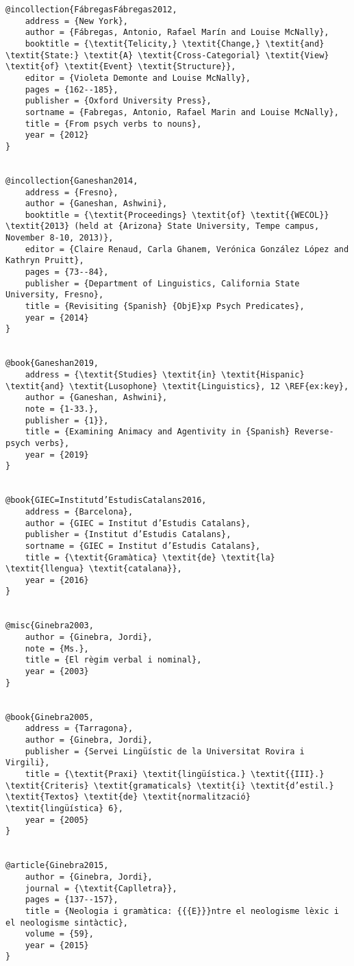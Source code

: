 \documentclass[output=paper,modfonts,nonflat]{langsci/langscibook}
\begin{document}
\begin{verbatim}
@incollection{FábregasFábregas2012,
	address = {New York},
	author = {Fábregas, Antonio, Rafael Marín and Louise McNally},
	booktitle = {\textit{Telicity,} \textit{Change,} \textit{and} \textit{State:} \textit{A} \textit{Cross-Categorial} \textit{View} \textit{of} \textit{Event} \textit{Structure}},
	editor = {Violeta Demonte and Louise McNally},
	pages = {162--185},
	publisher = {Oxford University Press},
	sortname = {Fabregas, Antonio, Rafael Marin and Louise McNally},
	title = {From psych verbs to nouns},
	year = {2012}
}


@incollection{Ganeshan2014,
	address = {Fresno},
	author = {Ganeshan, Ashwini},
	booktitle = {\textit{Proceedings} \textit{of} \textit{{WECOL}} \textit{2013} (held at {Arizona} State University, Tempe campus, November 8-10, 2013)},
	editor = {Claire Renaud, Carla Ghanem, Verónica González López and Kathryn Pruitt},
	pages = {73--84},
	publisher = {Department of Linguistics, California State University, Fresno},
	title = {Revisiting {Spanish} {ObjE}xp Psych Predicates},
	year = {2014}
}


@book{Ganeshan2019,
	address = {\textit{Studies} \textit{in} \textit{Hispanic} \textit{and} \textit{Lusophone} \textit{Linguistics}, 12 \REF{ex:key},
	author = {Ganeshan, Ashwini},
	note = {1-33.},
	publisher = {1}},
	title = {Examining Animacy and Agentivity in {Spanish} Reverse-psych verbs},
	year = {2019}
}


@book{GIEC=Institutd’EstudisCatalans2016,
	address = {Barcelona},
	author = {GIEC = Institut d’Estudis Catalans},
	publisher = {Institut d’Estudis Catalans},
	sortname = {GIEC = Institut d’Estudis Catalans},
	title = {\textit{Gramàtica} \textit{de} \textit{la} \textit{llengua} \textit{catalana}},
	year = {2016}
}


@misc{Ginebra2003,
	author = {Ginebra, Jordi},
	note = {Ms.},
	title = {El règim verbal i nominal},
	year = {2003}
}


@book{Ginebra2005,
	address = {Tarragona},
	author = {Ginebra, Jordi},
	publisher = {Servei Lingüístic de la Universitat Rovira i Virgili},
	title = {\textit{Praxi} \textit{lingüística.} \textit{{III}.} \textit{Criteris} \textit{gramaticals} \textit{i} \textit{d’estil.} \textit{Textos} \textit{de} \textit{normalització} \textit{lingüística} 6},
	year = {2005}
}


@article{Ginebra2015,
	author = {Ginebra, Jordi},
	journal = {\textit{Caplletra}},
	pages = {137--157},
	title = {Neologia i gramàtica: {{{E}}}ntre el neologisme lèxic i el neologisme sintàctic},
	volume = {59},
	year = {2015}
}



\end{verbatim}
\end{document}
